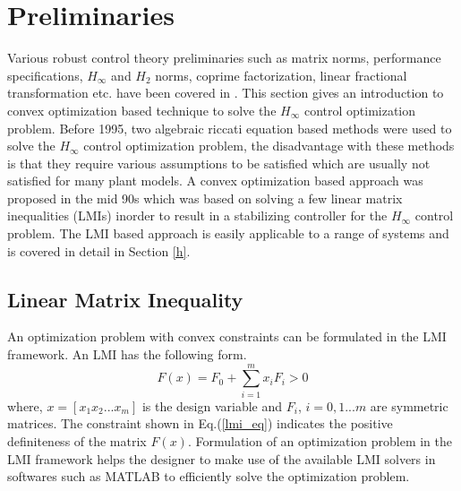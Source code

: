 \documentclass[a4paper,12pt]{article}
\begin{document}
\section{Preliminaries}
Various robust control theory preliminaries such as matrix norms, performance specifications, $H_{\infty}$ and $H_{2}$ norms, coprime factorization, linear fractional transformation etc. have been covered in \cite{prev}. This section gives an introduction to  convex optimization based technique to solve the $H_{\infty}$ control optimization problem. Before 1995, two algebraic riccati equation based methods were used to solve the $H_{\infty}$ control optimization problem, the disadvantage with these methods is that they require various assumptions to be satisfied which are usually not satisfied for many plant models. A convex optimization based approach was proposed in the mid 90s which was based on solving a few linear matrix inequalities (LMIs) inorder to result in a stabilizing controller for the $H_{\infty}$ control problem. The LMI based approach is easily applicable to a range of systems and is covered in detail in Section \ref{h}.
	\subsection{Linear Matrix Inequality}
	An optimization problem with convex constraints can be formulated in the LMI framework. An LMI has the following form.
		\begin{equation}
			\label{lmi_eq}
			F(x)=F_{0}+\sum_{i=1}^{m}x_{i}F_{i} > 0
		\end{equation}
		where, $x=[x_{1} x_{2} ... x_{m}]$ is the design variable and $F_{i}$, $i=0,1...m$ are symmetric matrices. The constraint shown in Eq.(\ref{lmi_eq}) indicates the positive definiteness of the matrix $F(x)$. Formulation of an optimization problem in the LMI framework helps the designer to make use of the available LMI solvers in softwares such as MATLAB to efficiently solve the optimization problem.
\end{document}
